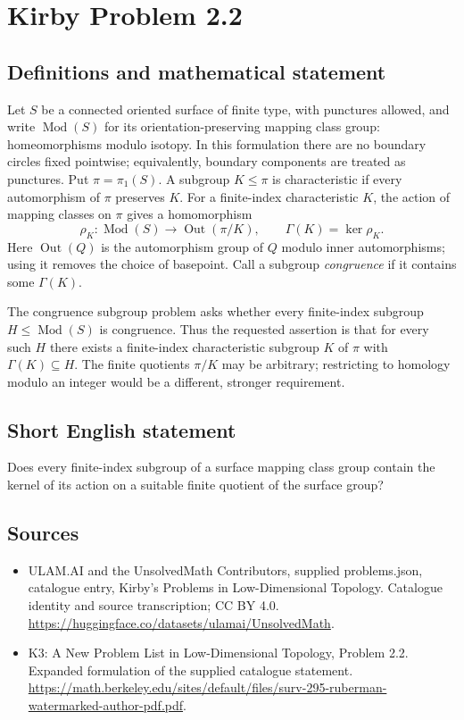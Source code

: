 \documentclass[11pt,a4paper]{article}
\begin{document}
\section*{Kirby Problem 2.2}\label{statement}

\subsection{Definitions and mathematical statement}
Let $S$ be a connected oriented surface of finite type, with punctures allowed,
and write $\operatorname{Mod}(S)$ for its orientation-preserving mapping class
group: homeomorphisms modulo isotopy. In this formulation there are no boundary
circles fixed pointwise; equivalently, boundary components are treated as punctures.
Put $\pi=\pi_1(S)$. A subgroup $K\leq\pi$ is characteristic if every automorphism
of $\pi$ preserves $K$. For a finite-index characteristic $K$, the action of mapping
classes on $\pi$ gives a homomorphism
\[
 \rho_K:\operatorname{Mod}(S)\longrightarrow\operatorname{Out}(\pi/K),
 \qquad \Gamma(K)=\ker\rho_K.
\]
Here $\operatorname{Out}(Q)$ is the automorphism group of $Q$ modulo inner
automorphisms; using it removes the choice of basepoint. Call a subgroup
\emph{congruence} if it contains some $\Gamma(K)$.

The congruence subgroup problem asks whether every finite-index subgroup
$H\leq\operatorname{Mod}(S)$ is congruence. Thus the requested assertion is that
for every such $H$ there exists a finite-index characteristic subgroup $K$ of
$\pi$ with $\Gamma(K)\subseteq H$. The finite quotients $\pi/K$ may be arbitrary;
restricting to homology modulo an integer would be a different, stronger requirement.
\subsection{Short English statement}
Does every finite-index subgroup of a surface mapping class group contain the kernel of its action on a suitable finite quotient of the surface group?
\subsection{Sources}
\begin{itemize}
\item[S1] ULAM.AI and the UnsolvedMath Contributors, supplied problems.json, catalogue entry, Kirby's Problems in Low-Dimensional Topology. Catalogue identity and source transcription; CC BY 4.0.
\url{https://huggingface.co/datasets/ulamai/UnsolvedMath}.
\item[S2] K3: A New Problem List in Low-Dimensional Topology, Problem 2.2. Expanded formulation of the supplied catalogue statement.
\url{https://math.berkeley.edu/sites/default/files/surv-295-ruberman-watermarked-author-pdf.pdf}.
\end{itemize}
\end{document}
